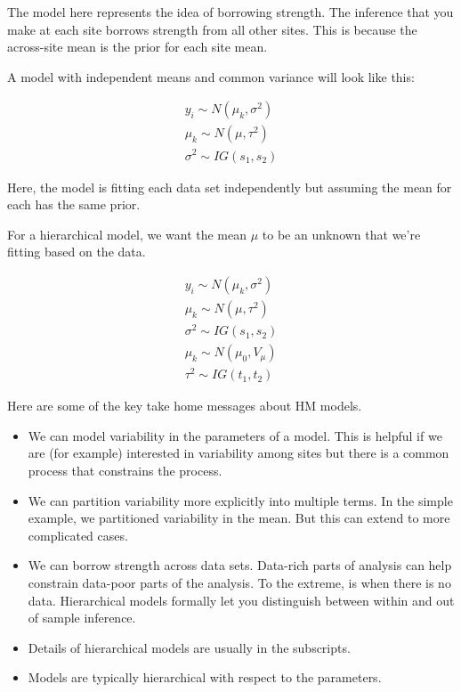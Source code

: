 \documentclass[12pt, oneside]{article}   	%
\begin{document}
The model here represents the idea of borrowing strength. The inference that you make at each site borrows strength from all other sites. This is because the across-site mean is the prior for each site mean.

A model with independent means and common variance will look like this:

\begin{align}
 y_i \sim N(\mu_k, \sigma^2) \\
 \mu_k \sim N(\mu, \tau^2) \\
 \sigma^2 \sim IG(s_1, s_2) 
\end{align}

Here, the model is fitting each data set independently but assuming the mean for each has the same prior. 

For a hierarchical model, we want the mean $\mu$ to be an unknown that we're fitting based on the data.

\begin{align}
 y_i \sim N(\mu_k, \sigma^2) \\
 \mu_k \sim N(\mu, \tau^2) \\
 \sigma^2 \sim IG(s_1, s_2) \\
  \mu_k \sim N(\mu_0, V_{\mu}) \\
\tau^2 \sim IG(t_1, t_2)
\end{align}

Here are some of the key take home messages about HM models.

\begin{itemize}
\item We can model variability in the parameters of a model. This is helpful if we are (for example) interested in variability among sites but there is a common process that constrains the process.
\item We can partition variability more explicitly into multiple terms. In the simple example, we partitioned variability in the mean. But this can extend to more complicated cases. 
\item We can borrow strength across data sets. Data-rich parts of analysis can help constrain data-poor parts of the analysis. To the extreme, is when there is no data. Hierarchical models formally let you distinguish between within and out of sample inference. 
\item Details of hierarchical models are usually in the subscripts.
\item Models are typically hierarchical with respect to the parameters. 
\end{itemize}
\end{document}
